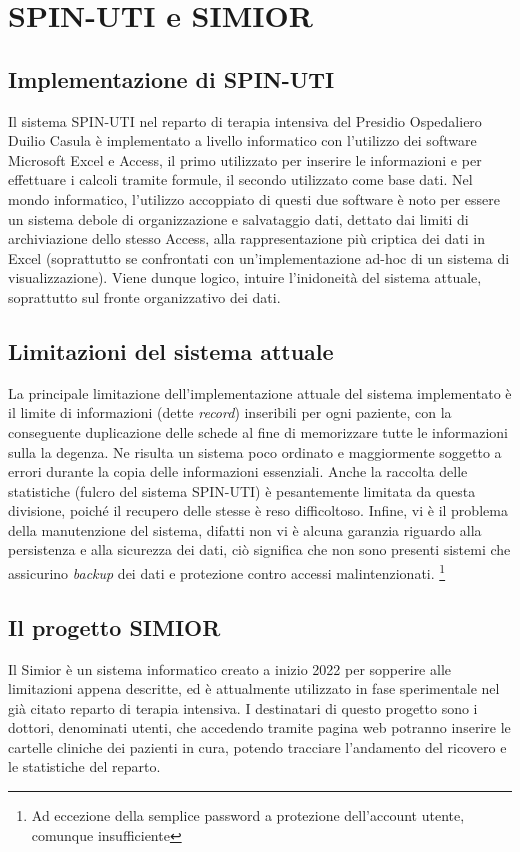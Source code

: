 \chapter{SPIN-UTI e SIMIOR}
\section{Implementazione di SPIN-UTI}
Il sistema SPIN-UTI nel reparto di terapia intensiva del Presidio Ospedaliero Duilio Casula è implementato a livello informatico con l'utilizzo dei software Microsoft Excel e Access, il primo utilizzato per inserire le informazioni e per effettuare i calcoli tramite formule, il secondo utilizzato come base dati.
Nel mondo informatico, l'utilizzo accoppiato di questi due software è noto per essere un sistema debole di organizzazione e salvataggio dati, dettato dai limiti di archiviazione dello stesso Access, alla rappresentazione più criptica dei dati in Excel (soprattutto se confrontati con un'implementazione ad-hoc di un sistema di visualizzazione).
Viene dunque logico, intuire l'inidoneità del sistema attuale, soprattutto sul fronte organizzativo dei dati.
\section{Limitazioni del sistema attuale}
La principale limitazione dell'implementazione attuale del sistema implementato è il limite di informazioni (dette \textit{record}) inseribili per ogni paziente, con la conseguente duplicazione delle schede al fine di memorizzare tutte le informazioni sulla la degenza. 
Ne risulta un sistema poco ordinato e maggiormente soggetto a errori durante la copia delle informazioni essenziali.
Anche la raccolta delle statistiche (fulcro del sistema SPIN-UTI) è pesantemente limitata da questa divisione, poiché il recupero delle stesse è reso difficoltoso.
Infine, vi è il problema della manutenzione del sistema, difatti non vi è alcuna garanzia riguardo alla persistenza e alla sicurezza dei dati, ciò significa che non sono presenti sistemi che assicurino \textit{backup} dei dati e protezione contro accessi malintenzionati. \footnote{Ad eccezione della semplice password a protezione dell'account utente, comunque insufficiente}
\section{Il progetto SIMIOR}
Il Simior è un sistema informatico creato a inizio 2022 per sopperire alle limitazioni appena descritte, ed è attualmente utilizzato in fase sperimentale nel già citato reparto di terapia intensiva.
I destinatari di questo progetto sono i dottori, denominati utenti, che accedendo tramite pagina web potranno inserire le cartelle cliniche dei pazienti in cura, potendo tracciare l'andamento del ricovero e le statistiche del reparto.
